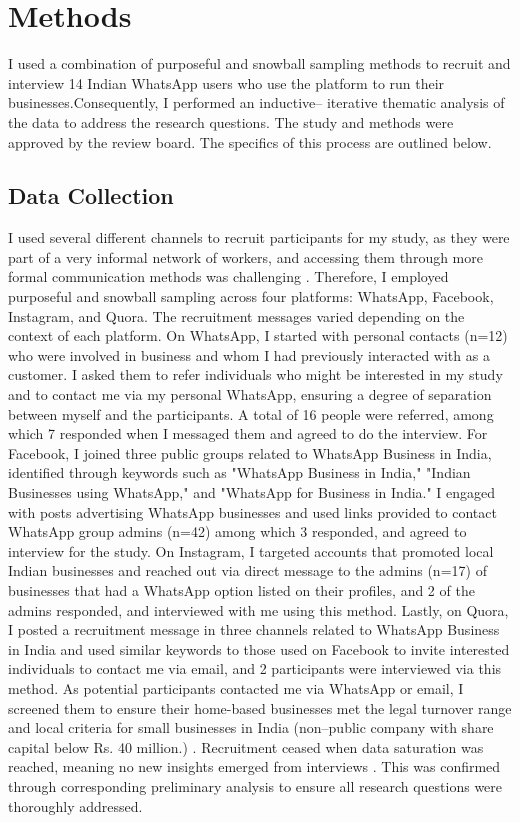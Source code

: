 \section{Methods}

I used a combination of purposeful and snowball sampling methods to recruit and interview 14 Indian WhatsApp users who use the platform to run their businesses.Consequently, I performed an inductive-- iterative thematic analysis of the data to address the research questions. The study and methods were approved by the review board. The specifics of this process are outlined below.


\subsection{Data Collection}

I used several different channels to recruit participants for my study, as they were part of a very informal network of workers, and accessing them through more formal communication methods was challenging \cite{agarwala2009economic, 10.1145/3025453.3025643, 10.1145/3290605.3300563}. Therefore, I employed purposeful \cite{suri2011purposeful} and snowball sampling \cite{parker2019snowball} across four platforms: WhatsApp, Facebook, Instagram, and Quora. The recruitment messages varied depending on the context of each platform. On WhatsApp, I started with personal contacts (n=12) who were involved in business and whom I had previously interacted with as a customer. I asked them to refer individuals who might be interested in my study and to contact me via my personal WhatsApp, ensuring a degree of separation between myself and the participants. A total of 16 people were referred, among which 7 responded when I messaged them and agreed to do the interview. For Facebook, I joined three public groups related to WhatsApp Business in India, identified through keywords such as "WhatsApp Business in India," "Indian Businesses using WhatsApp," and "WhatsApp for Business in India." I engaged with posts advertising WhatsApp businesses and used links provided to contact WhatsApp group admins (n=42) among which 3 responded, and agreed to interview for the study. On Instagram, I targeted accounts that promoted local Indian businesses and reached out via direct message to the admins (n=17) of businesses that had a WhatsApp option listed on their profiles, and 2 of the admins responded, and interviewed with me using this method. Lastly, on Quora, I posted a recruitment message in three channels related to WhatsApp Business in India and used similar keywords to those used on Facebook to invite interested individuals to contact me via email, and 2 participants were interviewed via this method. As potential participants contacted me via WhatsApp or email, I screened them to ensure their home-based businesses met the legal turnover range and local criteria for small businesses in India (non--public company with share capital below Rs. 40 million.) \cite{govindia2023}. Recruitment ceased when data saturation was reached, meaning no new insights emerged from interviews \cite{Charmaz2012}. This was confirmed through corresponding preliminary analysis to ensure all research questions were thoroughly addressed. 


